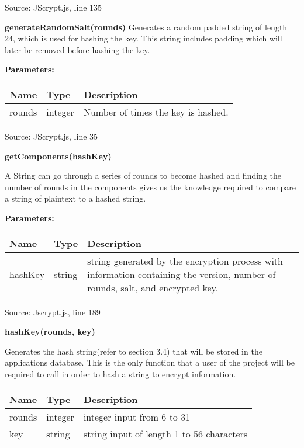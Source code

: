 \documentclass[12pt]{article}
\begin{document}
Source: JScrypt.js, line 135

\textbf{generateRandomSalt(rounds)}
Generates a random padded string of length 24, which is used for hashing the key. This string includes padding which will later be removed before hashing the key.

\textbf{Parameters:}
\begin{table}[H]
\centering
\label{tab:table2}
      \begin{tabular}{ | p{4cm} | p{4cm} | p{9cm} | }
        \hline
            \textbf{Name} & \textbf{Type} & \textbf{Description} \\
        \hline
          rounds & integer & Number of times the key is hashed.  \\
       \hline
      \end{tabular}
  \end{table}
Source: JScrypt.js, line 35


\textbf{getComponents(hashKey)}

A String can go through a series of rounds to become hashed and finding the number of rounds in the components gives us the knowledge required to compare a string of plaintext to a hashed string.

\textbf{Parameters:}
\begin{table}[H]
\centering
\label{tab:table2}
      \begin{tabular}{ | p{4cm} | p{4cm} | p{9cm} | }
        \hline
            \textbf{Name} & \textbf{Type} & \textbf{Description} \\
        \hline
          hashKey & string & string generated by the encryption process with information containing the version, number of rounds, salt, and encrypted key.  \\
       \hline
      \end{tabular}
  \end{table}
Source: Jscrypt.js, line 189

\textbf{hashKey(rounds, key)}

Generates the hash string(refer to section 3.4) that will be stored in the applications database. This is the only function that a user of the project will be required to call in order to hash a string to encrypt information.

\begin{table}[H]
\centering
\label{tab:table2}
      \begin{tabular}{ | p{4cm} | p{4cm} | p{9cm} | }
        \hline
            \textbf{Name} & \textbf{Type} & \textbf{Description} \\
        \hline
          rounds & integer & integer input from 6 to 31  \\
        \hline
          key & string & string input of length 1 to 56 characters \\
       \hline
      \end{tabular}
  \end{table}
\end{document}
